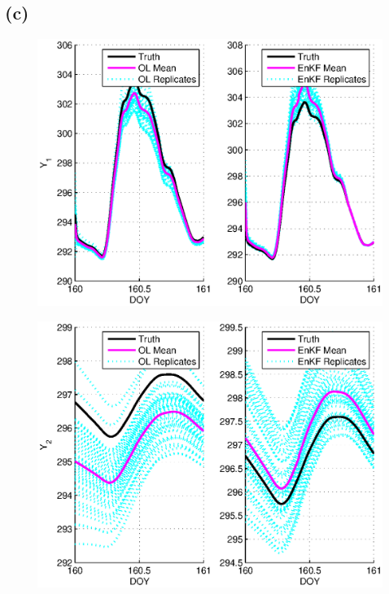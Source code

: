 \documentclass[letterpaper]{tufte-handout}
\begin{document}
\subsection{(c)}
\begin{figure}
  \includegraphics[width=\textwidth]{4cy1}
  \caption{}
\end{figure}
\begin{figure}
  \includegraphics[width=\textwidth]{4cy2}
  \caption{}
\end{figure}
\end{document}
